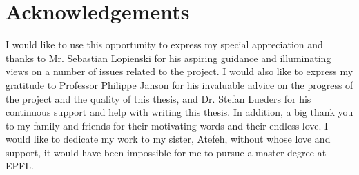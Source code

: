 \chapter*{Acknowledgements}
I would like to use this opportunity to express my special appreciation and thanks to Mr. Sebastian Lopienski for his aspiring guidance and illuminating views on a number of issues related to the project. I would also like to express my gratitude to Professor Philippe Janson for his invaluable advice on the progress of the project and the quality of this thesis, and Dr. Stefan Lueders for his continuous support and help with writing this thesis. In addition, a big thank you to my family and friends for their motivating words and their endless love. I would like to dedicate my work to my sister, Atefeh, without whose love and support, it would have been impossible for me to pursue a master degree at EPFL. 
\clearpage
